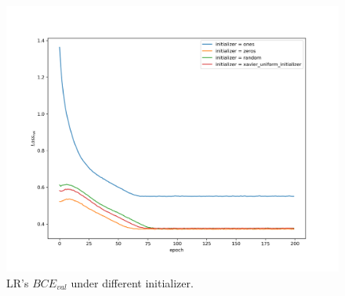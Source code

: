 \documentclass[journal, a4paper]{IEEEtran}
\begin{document}
\begin{figure}[!hbt]
	\begin{center}
		\includegraphics[width=\columnwidth]{lr_init_val_loss}
		\caption{LR's $BCE_{val}$ under different initializer.}
		\label{fig:lr_init_val_loss}
	\end{center}
\end{figure} \par
\end{document}

